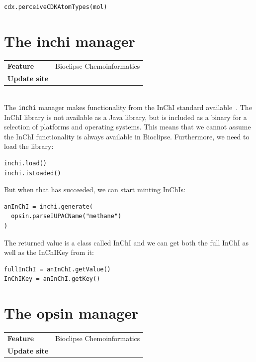 \documentclass[a5paper, 10pt]{memoir}
\begin{document}
\begin{refsection}
\begin{Verbatim}
cdx.perceiveCDKAtomTypes(mol)
\end{Verbatim}

\section{The inchi manager}

\begin{tabular}{ll}
\textbf{Feature} & Bioclipse Chemoinformatics \\
\textbf{Update site} & \url{} \\
\end{tabular} \\

\noindent
The \texttt{inchi} manager makes functionality from the InChI
standard available~\cite{heller2013inchi,spjuth2013applications}.
The InChI library is not available as a Java library, but is included as a
binary for a selection of platforms and operating systems. This means that we
cannot assume the InChI functionality is always available in Bioclipse.
Furthermore, we need to load the library:

\begin{Verbatim}
inchi.load()
inchi.isLoaded()
\end{Verbatim}
But when that has succeeded, we can start minting InChIs:

\begin{Verbatim}
anInChI = inchi.generate(
  opsin.parseIUPACName("methane")
)
\end{Verbatim}
The returned value is a class called InChI and we can get both the full InChI
as well as the InChIKey from it:

\begin{Verbatim}
fullInChI = anInChI.getValue()
InChIKey = anInChI.getKey()
\end{Verbatim}

\section{The opsin manager}

\begin{tabular}{ll}
\textbf{Feature} & Bioclipse Chemoinformatics \\
\textbf{Update site} & \url{} \\
\end{tabular} \\


\end{refsection}
\end{document}
